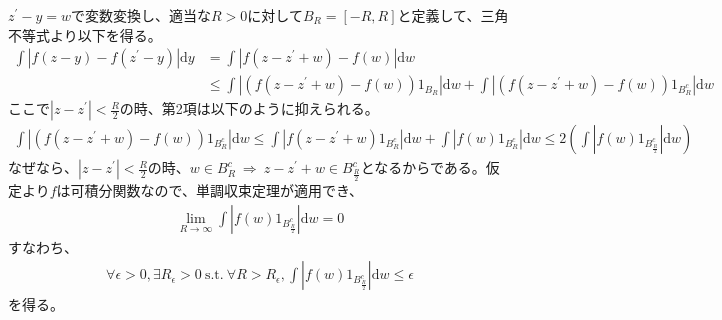 \documentclass{article}
\begin{document}
$z^{\prime} - y = w$で変数変換し、適当な$R > 0$に対して$B_R = [-R, R]$と定義して、三角不等式より以下を得る。
\begin{align}
	\int \left| f(z-y) - f(z^{\prime} -y) \right| \mathrm{d}y &= \int \left| f(z-z^{\prime}+w) - f(w) \right| \mathrm{d}w \nonumber \\[8pt]
	&\leq \int \left| \left( f(z-z^{\prime}+w) - f(w)\right) 1_{B_R} \right| \mathrm{d}w + \int \left| \left( f(z-z^{\prime}+w) - f(w)\right) 1_{B_R^c} \right| \mathrm{d}w
\end{align}
ここで$\left| z-z^{\prime} \right| < \frac{R}{2}$の時、第2項は以下のように抑えられる。
\begin{align*}
	\int \left| \left( f(z-z^{\prime}+w) - f(w)\right) 1_{B_R^c} \right| \mathrm{d}w \leq \int \left| f(z-z^{\prime}+w)1_{B_R^c} \right| \mathrm{d}w + \int \left| f(w)1_{B_R^c} \right| \mathrm{d}w \leq 2\left( \int \left| f(w)1_{B_{\frac{R}{2}}^c} \right| \mathrm{d}w \right)
\end{align*}
なぜなら、$\left| z-z^{\prime} \right| < \frac{R}{2}$の時、$w \in B_R^c\ \Rightarrow\ z-z^{\prime}+w \in B_{\frac{R}{2}}^c$となるからである。仮定より$f$は可積分関数なので、単調収束定理が適用でき、
\begin{align*}
	\lim_{R\to \infty} \int \left| f(w)1_{B_{\frac{R}{2}}^c} \right| \mathrm{d}w = 0
\end{align*}
すなわち、
\begin{align}
	\forall \epsilon > 0, \exists R_{\epsilon} > 0\ \text{s.t.}\ \forall R> R_{\epsilon},  \int \left| f(w)1_{B_{\frac{R}{2}}^c} \right| \mathrm{d}w \leq \epsilon
\end{align}
を得る。
\end{document}
